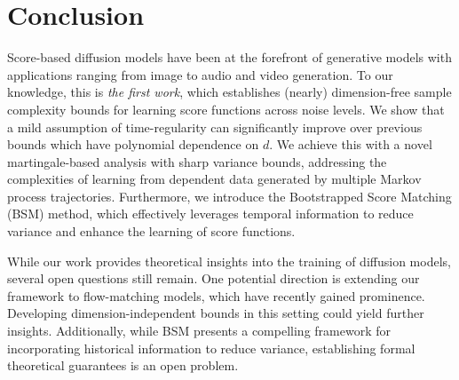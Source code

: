 \section{Conclusion}
\label{sec:conclusion}

Score-based diffusion models have been at the forefront of generative models with applications ranging from image to audio and video generation. To our knowledge, this is \textit{the first work}, which establishes (nearly) dimension-free sample complexity bounds for learning score functions across noise levels. We show that a mild assumption of time-regularity can significantly improve over previous bounds which have polynomial dependence on $d$.
We achieve this with a novel martingale-based analysis with sharp variance bounds, addressing the complexities of learning from dependent data generated by multiple Markov process trajectories. Furthermore, we introduce the Bootstrapped Score Matching (BSM) method, which effectively leverages temporal information to reduce variance and enhance the learning of score functions.

While our work provides theoretical insights into the training of diffusion models, several open questions still remain. One potential direction is extending our framework to flow-matching models, which have recently gained prominence. Developing dimension-independent bounds in this setting could yield further insights. Additionally, while BSM presents a compelling framework for incorporating historical information to reduce variance, establishing formal theoretical guarantees is an open problem.

